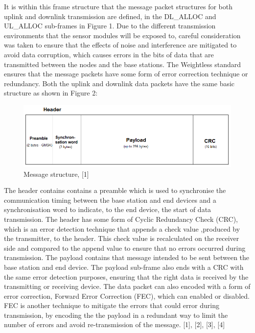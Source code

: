 \documentclass[12pt]{article}
\begin{document}
It is within this frame structure that the message packet structures for both uplink and downlink transmission are defined, in the  DL\_ALLOC and UL\_ALLOC  sub-frames in Figure 1. Due to the different transmission environments that the sensor modules will be exposed to, careful consideration was taken to ensure that the effects of noise and interference are mitigated to avoid data corruption, which causes errors in the bits of data that are transmitted between the nodes and the base stations. The Weightless standard ensures that the message packets have some form of error correction technique or redundancy. Both the uplink and downlink data packets have the same basic structure as shown in Figure 2: \newline \newline \newline \newline \newline

\begin{figure}[h]
\caption{Message structure, [1]}
\includegraphics[scale = 0.7]{./images/message_structure.png}
\end{figure}

The header contains contains a preamble which is used to synchronise the communication timing between the base station and end devices and a synchronisation word to indicate, to the end device, the start of data transmission. The header has some form of Cyclic Redundancy Check (CRC), which is an error detection technique that appends a check value ,produced by the transmitter, to the header. This check value is recalculated on the receiver side and compared to the append value to ensure that no errors occurred during transmission.  The payload contains that message intended to be sent between the base station and end device. The payload sub-frame also ends with a CRC with the same error detection purposes, ensuring that the right data is received by the transmitting or receiving device. The data packet can also encoded with a form of error correction, Forward Error Correction (FEC), which can enabled or disabled. FEC is another technique to mitigate the errors that could error during transmission, by encoding the the payload in a redundant way to limit the number of errors and avoid re-transmission of the message.
[1], [2], [3], [4]
\end{document}
